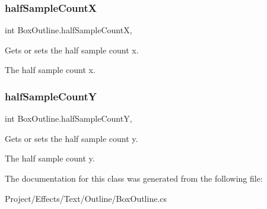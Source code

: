 \subsubsection{\texorpdfstring{half\+Sample\+CountX}{halfSampleCountX}}
{\footnotesize\ttfamily int Box\+Outline.\+half\+Sample\+CountX\hspace{0.3cm}{\ttfamily [get]}, {\ttfamily [set]}}



Gets or sets the half sample count x. 

The half sample count x.\mbox{\label{class_box_outline_a9c6dcbe45e4be7b977a063ffdcdc851e}} 
\subsubsection{\texorpdfstring{half\+Sample\+CountY}{halfSampleCountY}}
{\footnotesize\ttfamily int Box\+Outline.\+half\+Sample\+CountY\hspace{0.3cm}{\ttfamily [get]}, {\ttfamily [set]}}



Gets or sets the half sample count y. 

The half sample count y.

The documentation for this class was generated from the following file\+:\begin{DoxyCompactItemize}
\item 
Project/\+Effects/\+Text/\+Outline/Box\+Outline.\+cs\end{DoxyCompactItemize}
